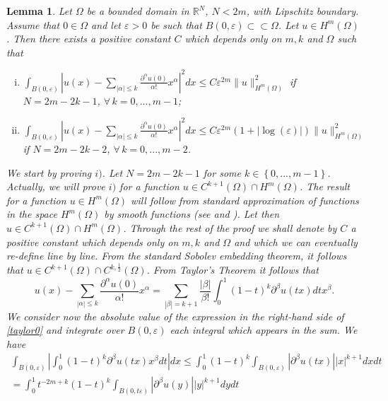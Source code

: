 \documentclass[11pt,a4paper]{amsart}
\numberwithin{equation}{section}
\newtheorem{lemma}[equation]{Lemma}
\begin{document}
\begin{lemma}\label{pre2}
Let $\Omega$ be a bounded domain in $\mathbb R^N$, $N<2m$, with Lipschitz boundary. Assume that $0\in\Omega$ and let $\varepsilon>0$ be such that $B(0,\varepsilon)\subset\subset\Omega$. Let $u\in H^m(\Omega)$. Then there exists a positive constant $C$ which depends only on $m,k$ and $\Omega$ such that
\begin{enumerate}[i)]
\item $\int_{B(0,\varepsilon)}{\left|u(x)-\sum_{|\alpha|\leq k}\frac{\partial^{\alpha}u(0)}{\alpha!}x^{\alpha}\right|^2dx}\leq C\varepsilon^{2m}\|u\|_{H^m(\Omega)}^2$ if $N=2m-2k-1$, $\forall\,k=0,...,m-1$;
\item $\int_{B(0,\varepsilon)}{\left|u(x)-\sum_{|\alpha|\leq k}\frac{\partial^{\alpha}u(0)}{\alpha!}x^{\alpha}\right|^2dx}\leq C\varepsilon^{2m}(1+|\log(\varepsilon)|)\|u\|_{H^m(\Omega)}^2$ if $N=2m-2k-2$, $\forall\,k=0,...,m-2$.
\end{enumerate}
\proof
We start by proving $i)$. Let $N=2m-2k-1$ for some $k\in\left\{0,...,m-1\right\}$. Actually, we will prove $i)$ for a function $u\in C^{k+1}(\Omega)\cap H^m(\Omega)$. The result for a function $u\in H^m(\Omega)$ will follow from standard approximation of functions in the space $H^m(\Omega)$ by smooth functions (see \cite[\S\,2.3]{burenkov} and \cite[\S\,5.3]{evans}). Let then $u\in C^{k+1}(\Omega)\cap H^m(\Omega)$. Through the rest of the proof we shall denote by $C$ a positive constant which depends only on $m,k$ and $\Omega$ and which we can eventually re-define line by line. From the standard Sobolev embedding theorem, it follows that $u\in C^{k+1}(\Omega)\cap C^{k,\frac{1}{2}}(\Omega)$. From Taylor's Theorem it follows that
\begin{equation}\label{taylor0}
u(x)-\sum_{|\alpha|\leq k}\frac{\partial^{\alpha}u(0)}{\alpha !}x^{\alpha}=\sum_{|\beta|=k+1}\frac{|\beta|}{\beta !}\int_0^1(1-t)^k\partial^{\beta}u(tx)dt x^{\beta}.
\end{equation}
We consider now the absolute value of the expression in the right-hand side of \eqref{taylor0} and integrate over $B(0,\varepsilon)$ each integral which appears in the sum. We have
\begin{multline}\label{est-tay}
\int_{B(0,\varepsilon)}\left|\int_0^1(1-t)^k\partial^{\beta}u(tx)x^{\beta}dt\right|dx\leq\int_0^1(1-t)^k\int_{B(0,\varepsilon)}|\partial^{\beta}u(tx)||x|^{k+1}dxdt\\
=\int_0^1t^{-2m+k}(1-t)^k\int_{B(0,t\varepsilon)}|\partial^{\beta}u(y)||y|^{k+1}dydt\\

\end{multline}
\end{lemma}
\end{document}
